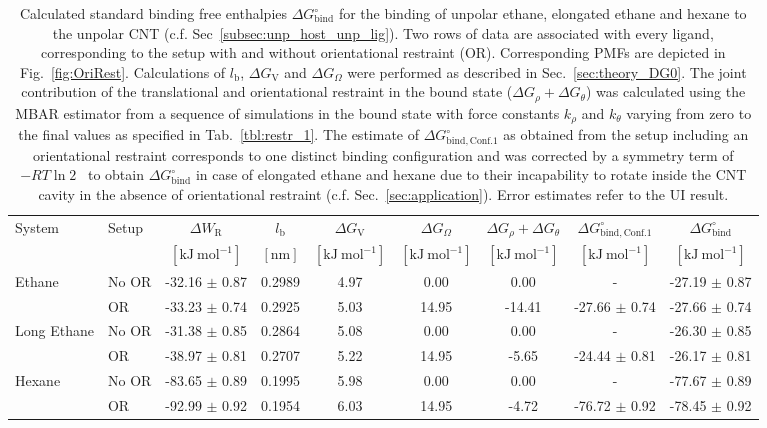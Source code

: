 \documentclass[9pt,lessons]{livecoms}
\begin{document}
\begin{table}[ht]
\caption{\label{tbl:unpLigOR} 
Calculated standard binding free enthalpies $\Delta G^\circ_\mathrm{bind}$ for the binding of unpolar ethane, elongated ethane and hexane to the unpolar CNT (c.f. Sec~\ref{subsec:unp_host_unp_lig}).
Two rows of data are associated with every ligand, corresponding to the setup with and without orientational restraint (OR).
Corresponding PMFs are depicted in Fig.~\ref{fig:OriRest}. 
Calculations of $l_\mathrm{b}$,  $\Delta G_\mathrm{V}$ and $\Delta G_\Omega$ were performed as described in Sec.~\ref{sec:theory_DG0}. 
The joint contribution of the translational and orientational restraint in the bound state ($\Delta G_\rho + \Delta G_\theta$) was calculated using the MBAR estimator from a sequence of simulations in the bound state with force constants $k_\rho$ and $k_\theta$ varying from zero to the final values as specified in Tab.~\ref{tbl:restr_1}. 
The estimate of $\Delta G^\circ_\mathrm{bind, Conf. 1}$ as obtained from the setup including an orientational restraint corresponds to one distinct binding configuration and was corrected 
by a symmetry term of $-RT \ln 2$~\cite{gilson2013correction, hermans1997inclusion} to obtain $\Delta G^\circ_\mathrm{bind}$ in case of elongated ethane and hexane 
due to their incapability to rotate inside the CNT cavity in the absence of orientational restraint (c.f. Sec.~\ref{sec:application}). 
Error estimates refer to the UI result.
}
\centering
\begin{tabular}{llc ccc ccc}\hline
System & Setup & $\Delta W_\mathrm{R}$  & $l_\mathrm{b}$ & $\Delta G_\mathrm{V}$ & $\Delta G_\Omega$ & 
$\Delta G_\rho + \Delta G_\theta$ & $\Delta G^\circ_\mathrm{bind, Conf. 1}$ & $\Delta G^\circ_\mathrm{bind}$ \\
& & $[\mathrm{kJ~mol}^{-1}]$ & $[\mathrm{nm}]$ &  $[\mathrm{kJ~mol}^{-1}]$ & $[\mathrm{kJ~mol}^{-1}]$ & $[\mathrm{kJ~mol}^{-1}]$ & $[\mathrm{kJ~mol}^{-1}]$ & $[\mathrm{kJ~mol}^{-1}]$ \\ 
\hline
\multirow{ 2}{*}{Ethane}  		& No OR 	& -32.16 $\pm$ 0.87 	& 0.2989 	&  4.97 	&  0.00 	&  0.00 	&  -  					& -27.19 $\pm$ 0.87 \\   
						& OR       	& -33.23 $\pm$ 0.74 	& 0.2925  	&  5.03 	&  14.95	&  -14.41 	&  -27.66 $\pm$ 0.74  	& -27.66 $\pm$ 0.74 \\ 
\hline
\multirow{ 2}{*}{Long Ethane}  	& No OR 	& -31.38 $\pm$ 0.85 	& 0.2864 	&  5.08 	&  0.00 	&  0.00 	&  -  					& -26.30 $\pm$ 0.85 \\    
					      	& OR       	& -38.97 $\pm$ 0.81 	& 0.2707  	&  5.22 	&  14.95 	&  -5.65 	&  -24.44 $\pm$ 0.81  	& -26.17 $\pm$ 0.81\\ 
\hline
\multirow{ 2}{*}{Hexane}  		& No OR 	& -83.65 $\pm$ 0.89 & 0.1995 	&  5.98 	&  0.00 	&  0.00 	&  -  					& -77.67 $\pm$ 0.89\\  
						& OR       	& -92.99 $\pm$ 0.92 & 0.1954  &  6.03 	&  14.95 	&  -4.72 	&  -76.72 $\pm$ 0.92  	& -78.45 $\pm$ 0.92\\   
\hline
\end{tabular}
\end{table}
\end{document}
